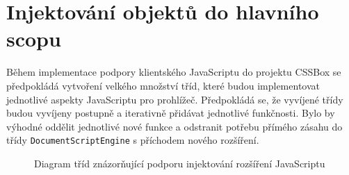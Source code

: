\section{Injektování objektů do hlavního scopu}
\label{Chapter.Design.GlobalScopeInjections}

Během implementace podpory klientského JavaScriptu do projektu CSSBox se
předpokládá vytvoření velkého množství tříd, které budou implementovat
jednotlivé aspekty JavaScriptu pro prohlížeč. Předpokládá se, že vyvíjené třídy budou vyvíjeny postupně a iterativně přidávat jednotlivé funkčnosti. Bylo by výhodné oddělit jednotlivé nové funkce a odstranit potřebu přímého zásahu do třídy \texttt{DocumentScriptEngine} s příchodem nového rozšíření.

\begin{figure}[H]
  \begin{center}
    \caption{Diagram tříd znázorňující podporu injektování rozšíření JavaScriptu}
    \label{Figure.GlobalScopeInjectionsDesign}
  \end{center}
\end{figure}

